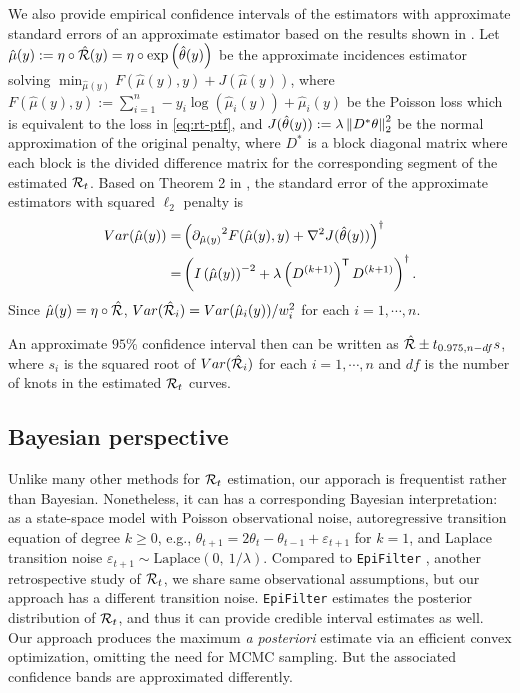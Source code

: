 We also provide empirical confidence intervals of the estimators with approximate 
standard errors of an approximate estimator based on the results shown in \cite{vaiter2017degrees}. 
Let $\hat{\mu}(y) := \eta\circ \hat{\mathcal{R}}(y) = \eta\circ \exp\left(\hat{\theta}(y)\right)$ 
be the approximate incidences estimator solving 
$\min_{\hat{\mu}(y)} F(\hat{\mu}(y), y) + J(\hat{\mu}(y))$, where  
$F(\hat{\mu}(y), y):=\sum_{i=1}^n -y_i \log(\hat{\mu}_i(y)) + \hat{\mu}_i(y)$ be 
the Poisson loss which is equivalent to the loss in \eqref{eq:rt-ptf}, and 
$J(\hat{\theta}(y)) := \lambda \left\lVert D^{\ast} \theta \right\rVert_2^2$ be the normal 
approximation of the original penalty, where $D^{\ast}$ is a block diagonal matrix 
where each block is the divided difference matrix for the corresponding segment of 
the estimated $\mathcal{R}_t$. Based on Theorem 2 in \cite{vaiter2017degrees}, the 
standard error of the approximate estimators with squared $\ell_2$ penalty is 
\begin{align}
  Var(\hat{\mu}(y)) =& \left( {\partial_{\hat{\mu}(y)}}^2 F(\hat{\mu}(y), y) + \nabla^2 J(\hat{\theta}(y))\right)^{\dagger} \\
  =& \left(I\left(\hat{\mu}(y)\right)^{-2} + \lambda \left(D^{(k+1)}\right)^{\mathsf{T}} D^{(k+1)}\right)^{\dagger}.
\end{align} 
Since $\hat{\mu}(y) = \eta\circ \hat{\mathcal{R}}$, $Var(\hat{\mathcal{R}}_i) = Var(\hat{\mu}_i(y)) / w_i^2$ 
for each $i = 1, \cdots, n$. 

An approximate $95\%$ confidence interval then can be written as $\hat{\mathcal{R}} \pm t_{0.975, n-df} s$, 
where $s_i$ is the squared root of $Var(\hat{\mathcal{R}}_i)$ for each $i = 1, \cdots, n$ 
and $df$ is the number of knots in the estimated $\mathcal{R}_t$ curves. 

\subsection{Bayesian perspective}

Unlike many other methods for $\mathcal{R}_t$ estimation, our apporach is frequentist
rather than Bayesian. Nonetheless, it can has a corresponding Bayesian
interpretation: as a state-space model with Poisson observational noise,
autoregressive transition equation of degree $k\geq 0$, e.g., $\theta_{t+1} =
2\theta_t - \theta_{t-1} + \varepsilon_{t+1}$ for $k=1$, and Laplace transition
noise $\varepsilon_{t+1}\sim \mathrm{Laplace}(0,\ 1/\lambda)$. Compared to
\texttt{EpiFilter} \citep{parag2021improved}, another retrospective study of
$\mathcal{R}_t$, we share same observational assumptions, but our approach has a
different transition noise. \texttt{EpiFilter} estimates the posterior
distribution of
$\mathcal{R}_t$, and thus it can provide credible interval estimates as well. Our
approach produces the maximum \emph{a posteriori} estimate via an efficient
convex optimization, omitting the need for MCMC sampling. But the associated
confidence bands are approximated differently.
